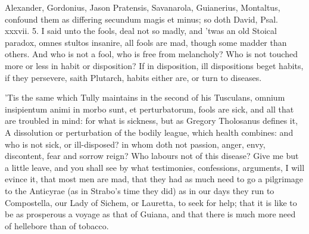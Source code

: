 {Alexander, Gordonius, Jason Pratensis, Savanarola, Guianerius,
Montaltus, confound them as differing secundum magis et minus; so doth
David, Psal. xxxvii. 5. I said unto the fools, deal not so madly, and
'twas an old Stoical paradox, omnes stultos insanire, all fools
are mad, though some madder than others. And who is not a fool, who is
free from melancholy? Who is not touched more or less in habit or
disposition? If in disposition, ill dispositions beget habits, if they
persevere, saith Plutarch, habits either are, or turn to diseases.

'Tis the same which Tully maintains in the second of his Tusculans,
omnium insipientum animi in morbo sunt, et perturbatorum, fools are
sick, and all that are troubled in mind: for what is sickness, but as
Gregory Tholosanus defines it, A dissolution or perturbation of
the bodily league, which health combines: and who is not sick, or
ill-disposed? in whom doth not passion, anger, envy, discontent, fear
and sorrow reign? Who labours not of this disease? Give me but a little
leave, and you shall see by what testimonies, confessions, arguments, I
will evince it, that most men are mad, that they had as much need to go
a pilgrimage to the Anticyrae (as in Strabo's time they did) as in
our days they run to Compostella, our Lady of Sichem, or Lauretta, to
seek for help; that it is like to be as prosperous a voyage as that of
Guiana, and that there is much more need of hellebore than of tobacco.

}
